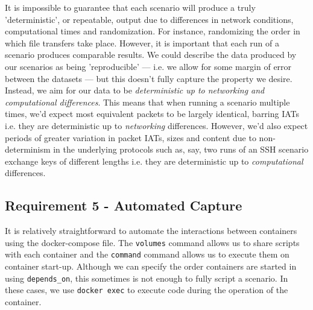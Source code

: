 \documentclass[msc,deptreport, cs]{infthesis} %
\begin{document}
It is impossible to guarantee that each scenario will produce a truly 'deterministic', or repeatable, output due to  differences in network conditions, computational times and randomization. For instance, randomizing the order in which file transfers take place. However, it is important that each run of a scenario produces comparable results. We could describe the data produced by our scenarios as being 'reproducible' --- i.e. we allow for some margin of error between the datasets --- but this doesn't fully capture the property we desire. Instead, we aim for our data to be \textit{deterministic up to networking and computational differences}. This means that when running a scenario multiple times, we'd expect most equivalent packets to be largely identical, barring IATs i.e. they are deterministic up to \textit{networking} differences. However, we'd also expect periods of greater variation in packet IATs, sizes and content due to non-determinism in the underlying protocols such as, say, two runs of an SSH scenario exchange keys of different lengths i.e. they are deterministic up to \textit{computational} differences.

\subsection{Requirement 5 - Automated Capture}

It is relatively straightforward to automate the interactions between containers using the docker-compose file. The \texttt{volumes} command allows us to share scripts with each container and the \texttt{command} command allows us to execute them on container start-up. Although we can specify the order containers are started in using \texttt{depends\_on}, this sometimes is not enough to fully script a scenario. In these cases, we use \texttt{docker exec} to execute code during the operation of the container.
\end{document}
